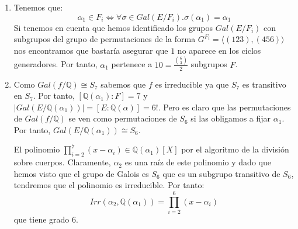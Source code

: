 \documentclass{article}
\theoremstyle{theorem-style}  %
\theoremstyle{definition-style}
\theoremstyle{example-style}
\begin{document}
\begin{enumerate}
\item Tenemos que: $$\alpha_1 \in F_i \iff \forall \sigma \in Gal(E/F_i).\sigma(\alpha_1) = \alpha_1$$ Si tenemos en cuenta que hemos identificado los grupos $Gal(E/F_i)$ con subgrupos del grupo de permutaciones de la forma $G^{F_i} = \langle (123),(456) \rangle$ nos encontramos que bastaría asegurar que $1$ no aparece en los ciclos generadores. Por tanto, $\alpha_1$ pertenece a $10 = \frac{\binom{6}{3}}{2}$ subgrupos $F$.

\item Como $Gal(f/\mathbb{Q}) \cong S_7$ sabemos que $f$ es irreducible ya que $S_7$ es transitivo en $S_7$. Por tanto, $[\mathbb{Q}(\alpha_1):F] = 7$ y $|Gal(E/\mathbb{Q}(\alpha_1))| = [E:\mathbb{Q}(\alpha)] = 6!$. Pero es claro que las permutaciones de $Gal(f/\mathbb{Q})$ se ven como permutaciones de $S_{6}$ si las obligamos a fijar $\alpha_1$. Por tanto, $Gal(E/\mathbb{Q}(\alpha_1)) \cong S_6$.

El polinomio $\prod_{i = 2}^7 (x-\alpha_i) \in \mathbb{Q}(\alpha_1)[X]$ por el algoritmo de la división sobre cuerpos. Claramente, $\alpha_2$ es una raíz de este polinomio y dado que hemos visto que el grupo de Galois es $S_6$ que es un subgrupo transitivo de $S_6$, tendremos que el polinomio es irreducible. Por tanto: $$Irr(\alpha_2,\mathbb{Q}(\alpha_1)) = \prod_{i = 2}^6 (x-\alpha_i)$$ que tiene grado 6. 
\end{enumerate}

\printbibliography
\end{document}
